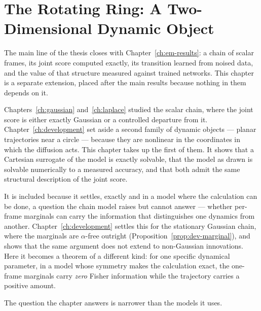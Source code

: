 %

\chapter{The Rotating Ring: A Two-Dimensional Dynamic Object}
\label{ch:ring}

The main line of the thesis closes with
Chapter~\ref{ch:em-results}: a chain of scalar frames, its joint score computed
exactly, its transition learned from noised data, and the value of that
structure measured against trained networks. This chapter is a separate
extension, placed after the main results because nothing in them depends on it.

Chapters~\ref{ch:gaussian} and~\ref{ch:laplace} studied the scalar chain, where
the joint score is either exactly Gaussian or a controlled departure from it.
Chapter~\ref{ch:development} set aside a second family of dynamic objects ---
planar trajectories near a circle --- because they are nonlinear in the
coordinates in which the diffusion acts. This chapter takes up the first of
them. It shows that a Cartesian surrogate of the model is exactly solvable,
that the model as drawn is solvable numerically to a measured accuracy, and
that both admit the same structural description of the joint score.

It is included because it settles, exactly and in a model
where the calculation can be done, a question the chain model raises but cannot
answer --- whether per-frame marginals can carry the information that
distinguishes one dynamics from another. Chapter~\ref{ch:development} settles
this for the stationary Gaussian chain, where the marginals are
$\alpha$-free outright (Proposition~\ref{prop:dev-marginal}), and shows that the
same argument does not extend to non-Gaussian innovations. Here it becomes a
theorem of a different kind: for one specific dynamical parameter, in a model
whose symmetry makes the calculation exact, the one-frame marginals carry
\emph{zero} Fisher information while the trajectory carries a positive amount.

The question the chapter answers is narrower than the models it uses.

